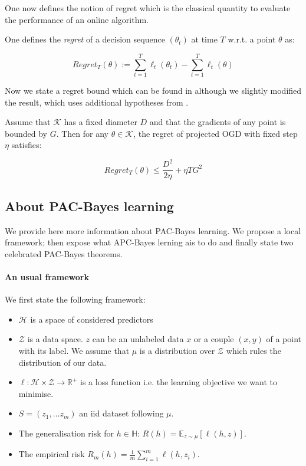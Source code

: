 \begin{noaddcontents}
One now defines the notion of regret which is the classical quantity to evaluate the performance of an online algorithm.
 \begin{definition}
One defines the \emph{regret} of a decision sequence $(\theta_t)$ at time $T$  w.r.t. a point $\theta$ as:

\[ Regret_T(\theta):= \sum_{t=1}^T \ell_t(\theta_t) -  \sum_{t=1}^T \ell_t(\theta)  \]


\end{definition}


Now we state a regret bound which can be found in \cite[Eq 2.5]{shalev2012online} although we slightly modified the result, which uses additional hypotheses from \cite{hazan2016introduction}.

\begin{proposition}
  \label{prop: OGD_bound}
  Assume that $\mathcal{K}$ has a fixed diameter $D$ and that the gradients of any point is bounded by $G$. Then for any $\theta\in\mathcal{K}$, the regret of projected OGD with fixed step $\eta$ satisfies:

  \[ Regret_T(\theta) \leq \frac{D^2}{2\eta} + \eta T G^2     \]
\end{proposition}


\subsection{About PAC-Bayes learning}

We provide here more information about PAC-Bayes learning. We propose a local framework; then expose what APC-Bayes lerning ais to do and finally state two celebrated PAC-Bayes theorems.

\paragraph{An usual framework}
We first state the following framework:
\begin{itemize}
  \item $\mathcal{H}$ is a space of considered predictors
  \item $\mathcal{Z}$ is a data space. $z$ can be an unlabeled data $x$ or a couple $(x,y)$ of a point with its label. We assume that $\mu$ is a distribution over $\mathcal{Z}$ which rules the distribution of our data.
  \item $\ell: \mathcal{H}\times \mathcal{Z}\rightarrow \mathbb{R}^+$ is a loss function i.e. the learning objective we want to minimise.
  \item $S=(z_1,...z_m)$ an iid dataset following $\mu$.
  \item The generalisation risk for $h\in\mathbb{H}$: $R(h)= \mathbb{E}_{z\sim \mu}[\ell(h,z)]$.
  \item The empirical risk $R_m(h)= \frac{1}{m}\sum_{i=1}^m \ell(h,z_i)$.
\end{itemize}



\end{noaddcontents}
